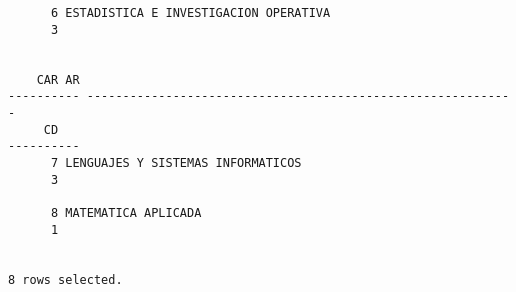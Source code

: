 \documentclass[11pt]{report}
\begin{document}
\begin{itemize}
\begin{verbatim}
      6 ESTADISTICA E INVESTIGACION OPERATIVA                                
      3                                                                      
                                                                             

    CAR AR                                                                   
---------- ------------------------------------------------------------         
     CD                                                                      
----------                                                                      
      7 LENGUAJES Y SISTEMAS INFORMATICOS                                    
      3                                                                      
                                                                             
      8 MATEMATICA APLICADA                                                  
      1                                                                      
                                                                             

8 rows selected.
  \end{verbatim}
\end{itemize}

\end{document}
